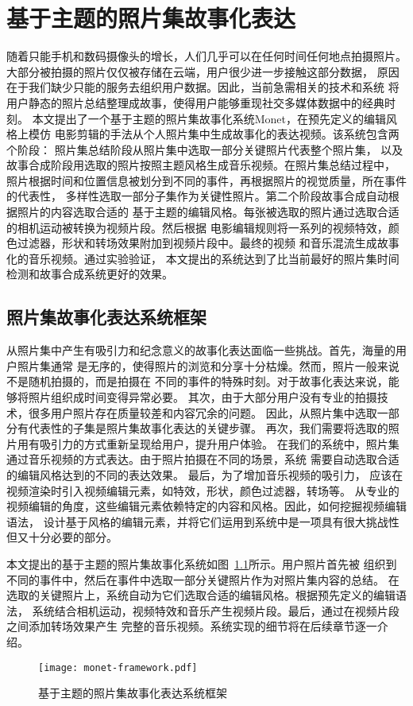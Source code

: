 \chapter{基于主题的照片集故事化表达}
随着只能手机和数码摄像头的增长，人们几乎可以在任何时间任何地点拍摄照片。
大部分被拍摄的照片仅仅被存储在云端，用户很少进一步接触这部分数据，
原因在于我们缺少只能的服务去组织用户数据。因此，当前急需相关的技术和系统
将用户静态的照片总结整理成故事，使得用户能够重现社交多媒体数据中的经典时刻。
本文提出了一个基于主题的照片集故事化系统Monet，在预先定义的编辑风格上模仿
电影剪辑的手法从个人照片集中生成故事化的表达视频。该系统包含两个阶段：
照片集总结阶段从照片集中选取一部分关键照片代表整个照片集，
以及故事合成阶段用选取的照片按照主题风格生成音乐视频。在照片集总结过程中，
照片根据时间和位置信息被划分到不同的事件，再根据照片的视觉质量，所在事件的代表性，
多样性选取一部分子集作为关键性照片。第二个阶段故事合成自动根据照片的内容选取合适的
基于主题的编辑风格。每张被选取的照片通过选取合适的相机运动被转换为视频片段。然后根据
电影编辑规则将一系列的视频特效，颜色过滤器，形状和转场效果附加到视频片段中。最终的视频
和音乐混流生成故事化的音乐视频。通过实验验证，
本文提出的系统达到了比当前最好的照片集时间检测和故事合成系统更好的效果。

\section{照片集故事化表达系统框架}
从照片集中产生有吸引力和纪念意义的故事化表达面临一些挑战。首先，海量的用户照片集通常
是无序的，使得照片的浏览和分享十分枯燥。然而，照片一般来说不是随机拍摄的，而是拍摄在
不同的事件的特殊时刻。对于故事化表达来说，能够将照片组织成时间变得异常必要。
其次，由于大部分用户没有专业的拍摄技术，很多用户照片存在质量较差和内容冗余的问题。
因此，从照片集中选取一部分有代表性的子集是照片集故事化表达的关键步骤。
再次，我们需要将选取的照片用有吸引力的方式重新呈现给用户，提升用户体验。
在我们的系统中，照片集通过音乐视频的方式表达。由于照片拍摄在不同的场景，系统
需要自动选取合适的编辑风格达到的不同的表达效果。
最后，为了增加音乐视频的吸引力，
应该在视频渲染时引入视频编辑元素，如特效，形状，颜色过滤器，转场等。
从专业的视频编辑的角度，这些编辑元素依赖特定的内容和风格。因此，如何挖掘视频编辑语法，
设计基于风格的编辑元素，并将它们运用到系统中是一项具有很大挑战性但又十分必要的部分。

本文提出的基于主题的照片集故事化系统如图~\ref{fig:monet-framework}所示。用户照片首先被
组织到不同的事件中，然后在事件中选取一部分关键照片作为对照片集内容的总结。
在选取的关键照片上，系统自动为它们选取合适的编辑风格。根据预先定义的编辑语法，
系统结合相机运动，视频特效和音乐产生视频片段。最后，通过在视频片段之间添加转场效果产生
完整的音乐视频。系统实现的细节将在后续章节逐一介绍。
\begin{figure}[ht]
    \center
    \texttt{[image: monet-framework.pdf]}
    \caption{基于主题的照片集故事化表达系统框架}
    \label{fig:monet-framework}
\end{figure}

